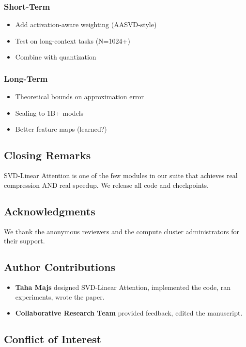 \subsubsection{Short-Term}
\begin{itemize}
\item Add activation-aware weighting (AASVD-style)
\item Test on long-context tasks (N=1024+)
\item Combine with quantization

\end{itemize}
\subsubsection{Long-Term}
\begin{itemize}
\item Theoretical bounds on approximation error
\item Scaling to 1B+ models
\item Better feature maps (learned?)

\end{itemize}
\subsection{Closing Remarks}

SVD-Linear Attention is one of the few modules in our suite that achieves 
real compression AND real speedup. We release all code and checkpoints.

\subsection{Acknowledgments}

We thank the anonymous reviewers and the compute cluster administrators for their support.

\subsection{Author Contributions}

\begin{itemize}
\item \textbf{Taha Majs} designed SVD-Linear Attention, implemented the code,
  ran experiments, wrote the paper.
\item \textbf{Collaborative Research Team} provided feedback, edited the manuscript.

\end{itemize}
\subsection{Conflict of Interest}

